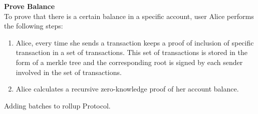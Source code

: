 \begin{Protocol*}[h]
\begin{mdframed}


\textbf{Prove Balance}\\
To prove that there is a certain balance in a specific account, user Alice performs the following steps:

\begin{enumerate}

\item Alice, every time she sends a transaction keeps a proof of inclusion of specific transaction in a set of transactions. This set of transactions is stored in the form of a merkle tree and the corresponding root is signed by each sender involved in the set of transactions. 

\item Alice calculates a recursive zero-knowledge proof of her account balance. 




\end{enumerate}
\normalsize	
\end{mdframed}
\caption{Adding batches to rollup Protocol.\label{alg:adding}}
\end{Protocol*}